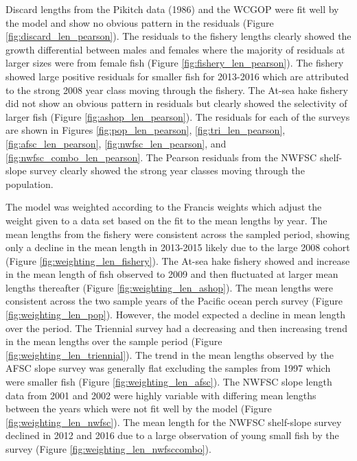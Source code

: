 \documentclass[12pt,]{article}
\begin{document}
Discard lengths from the Pikitch data (1986) and the WCGOP were fit well
by the model and show no obvious pattern in the residuals (Figure
\ref{fig:discard_len_pearson}). The residuals to the fishery lengths
clearly showed the growth differential between males and females where
the majority of residuals at larger sizes were from female fish (Figure
\ref{fig:fishery_len_pearson}). The fishery showed large positive
residuals for smaller fish for 2013-2016 which are attributed to the
strong 2008 year class moving through the fishery. The At-sea hake
fishery did not show an obvious pattern in residuals but clearly showed
the selectivity of larger fish (Figure \ref{fig:ashop_len_pearson}). The
residuals for each of the surveys are shown in Figures
\ref{fig:pop_len_pearson}, \ref{fig:tri_len_pearson},
\ref{fig:afsc_len_pearson}, \ref{fig:nwfsc_len_pearson}, and
\ref{fig:nwfsc_combo_len_pearson}. The Pearson residuals from the NWFSC
shelf-slope survey clearly showed the strong year classes moving through
the population.

The model was weighted according to the Francis weights which adjust the
weight given to a data set based on the fit to the mean lengths by year.
The mean lengths from the fishery were consistent across the sampled
period, showing only a decline in the mean length in 2013-2015 likely
due to the large 2008 cohort (Figure \ref{fig:weighting_len_fishery}).
The At-sea hake fishery showed and increase in the mean length of fish
observed to 2009 and then fluctuated at larger mean lengths thereafter
(Figure \ref{fig:weighting_len_ashop}). The mean lengths were consistent
across the two sample years of the Pacific ocean perch survey (Figure
\ref{fig:weighting_len_pop}). However, the model expected a decline in
mean length over the period. The Triennial survey had a decreasing and
then increasing trend in the mean lengths over the sample period (Figure
\ref{fig:weighting_len_triennial}). The trend in the mean lengths
observed by the AFSC slope survey was generally flat excluding the
samples from 1997 which were smaller fish (Figure
\ref{fig:weighting_len_afsc}). The NWFSC slope length data from 2001 and
2002 were highly variable with differing mean lengths between the years
which were not fit well by the model (Figure
\ref{fig:weighting_len_nwfsc}). The mean length for the NWFSC
shelf-slope survey declined in 2012 and 2016 due to a large observation
of young small fish by the survey (Figure
\ref{fig:weighting_len_nwfsccombo}).
\end{document}

